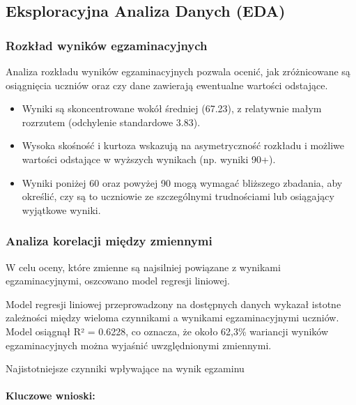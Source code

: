 \documentclass[
]{article}
\begin{document}
\subsection{Eksploracyjna Analiza Danych
(EDA)}\label{eksploracyjna-analiza-danych-eda}

\subsubsection{Rozkład wyników
egzaminacyjnych}\label{rozkux142ad-wynikuxf3w-egzaminacyjnych}

Analiza rozkładu wyników egzaminacyjnych pozwala ocenić, jak
zróżnicowane są osiągnięcia uczniów oraz czy dane zawierają ewentualne
wartości odstające.

\begin{itemize}
\item
  Wyniki są skoncentrowane wokół średniej (67.23), z relatywnie małym
  rozrzutem (odchylenie standardowe 3.83).
\item
  Wysoka skośność i kurtoza wskazują na asymetryczność rozkładu i
  możliwe wartości odstające w wyższych wynikach (np. wyniki 90+).
\item
  Wyniki poniżej 60 oraz powyżej 90 mogą wymagać bliższego zbadania, aby
  określić, czy są to uczniowie ze szczególnymi trudnościami lub
  osiągający wyjątkowe wyniki.
\end{itemize}

\subsubsection{Analiza korelacji między
zmiennymi}\label{analiza-korelacji-miux119dzy-zmiennymi}

W celu oceny, które zmienne są najsilniej powiązane z wynikami
egzaminacyjnymi, oszcowano model regresji liniowej.

Model regresji liniowej przeprowadzony na dostępnych danych wykazał
istotne zależności między wieloma czynnikami a wynikami egzaminacyjnymi
uczniów. Model osiągnął R² = 0.6228, co oznacza, że około 62,3\%
wariancji wyników egzaminacyjnych można wyjaśnić uwzględnionymi
zmiennymi.

Najistotniejsze czynniki wpływające na wynik egzaminu

\paragraph{Kluczowe wnioski:}\label{kluczowe-wnioski}
\end{document}
